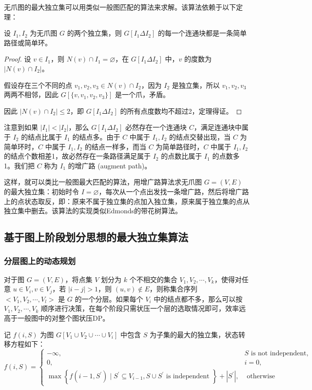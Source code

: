 \documentclass[lang=cn,11pt,a4paper]{elegantpaper}
\begin{document}
无爪图的最大独立集可以用类似一般图匹配的算法来求解。该算法依赖于以下定理：

\begin{theorem}
    设 $I_1, I_2$ 为无爪图 $G$ 的两个独立集，则 $G[I_1\Delta I_2]$ 的每一个连通块都是一条简单路径或简单环。
\end{theorem}
\begin{proof}
    设 $v \in I_1$，则 $N(v) \cap I_1 = \varnothing$，在 $G[I_1\Delta I_2]$ 中，$v$ 的度数为 $|N(v) \cap I_2|$。

    假设存在三个不同的点 $v_1, v_2, v_3 \in N(v) \cap I_2$，因为 $I_2$ 是独立集，所以 $v_1, v_2, v_3$ 两两不相邻，因此 $G[\{v, v_1, v_2, v_3\}]$ 是一个爪，矛盾。

    因此 $|N(v) \cap I_2| \le 2$，即 $G[I_1\Delta I_2]$ 的所有点度数均不超过2，定理得证。
\end{proof}

注意到如果 $|I_1| < |I_2|$，那么 $G[I_1\Delta I_2]$ 必然存在一个连通块 $C$，满足连通块中属于 $I_2$ 的结点比属于 $I_1$ 的结点多。由于 $C$ 中属于 $I_1, I_2$ 的结点交替出现，当 $C$ 为简单环时，$C$ 中属于 $I_1, I_2$ 的结点一样多，而当 $C$ 为简单路径时，$C$ 中属于 $I_1, I_2$ 的结点个数相差1，故必然存在一条路径满足属于 $I_2$ 的点数比属于 $I_1$ 的点数多 1。我们把 $C$ 称为 $I_1$ 的增广路 (augment path)。

这样，就可以类比一般图最大匹配的算法，用增广路算法求无爪图 $G=(V, E)$ 的最大独立集：初始时令 $I = \varnothing$，每次从一个点出发找一条增广路，然后将增广路上的点状态取反，即：原来不属于独立集的点加入独立集，原来属于独立集的点从独立集中删去。该算法的实现类似Edmonds的带花树算法。

\subsection{基于图上阶段划分思想的最大独立集算法}
\subsubsection{分层图上的动态规划}
对于图 $G = (V, E)$，将点集 $V$ 划分为 $k$ 个不相交的集合 $V_1, V_2, \cdots, V_k$，使得对任意 $u \in V_i, v \in V_j$，若 $|i - j| > 1$，则 $(u, v) \notin E$，则称集合序列 $<V_1, V_2, \cdots, V_l>$ 是 $G$ 的一个分层。如果每个 $V_i$ 中的结点都不多，那么可以按 $V_1, V_2, \cdots, V_k$ 顺序进行决策，在每个阶段只需状压一个层的选取情况即可，效率远高于一般图中的对整个图状压DP。

记 $f(i, S)$ 为图 $G[V_1 \cup V_2 \cup \cdots \cup V_i]$ 中包含 $S$ 为子集的最大的独立集，状态转移方程如下：
\[f(i, S)=\left\{\begin{array}{ll}
    -\infty, & S \text { is not independent, } \\
    0, & i=0, \\
    \max \left\{f\left(i-1, S^{\prime}\right) \mid S^{\prime} \subseteq V_{i-1}, S \cup S^{\prime} \text { is independent }\right\}+\left|S^{\prime}\right|, & \text { otherwise }
\end{array}\right.\]
\end{document}
